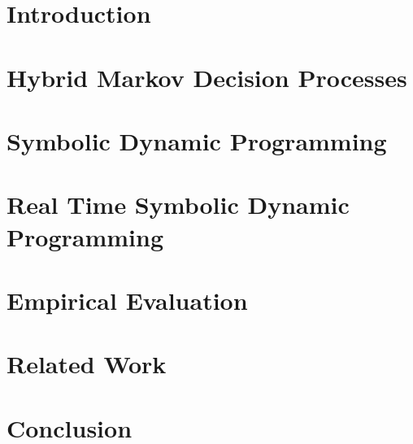 \documentclass[letterpaper]{article}
\begin{document}
\section{Introduction}

\section{Hybrid Markov Decision Processes}

\section{Symbolic Dynamic Programming}

\section{Real Time Symbolic Dynamic Programming}

\section{Empirical Evaluation}

\section{Related Work}

\section{Conclusion}


\newpage
~
\newpage
~
\newpage


\end{document}
